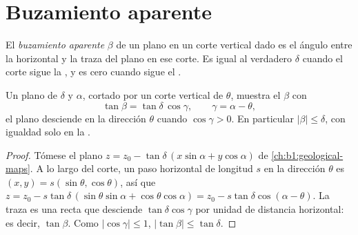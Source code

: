 \section{Buzamiento aparente}\label{sec:b1:cross-sections:apparent}

\begin{definition}\label{def:b1:cross-sections:apparent-dip}
El \emph{buzamiento aparente} $\beta$ de un plano en un corte vertical
dado es el ángulo entre la horizontal y la traza del plano en ese corte. Es igual al 
verdadero $\delta$ cuando el corte sigue la , y es cero cuando sigue el .
\end{definition}

\begin{theorem}\label{thm:b1:cross-sections:apparent-dip}
Un plano de  $\delta$ y  $\alpha$, cortado por un corte vertical
de  $\theta$, muestra el  $\beta$ con
\[
  \tan\beta = \tan\delta\,\cos\gamma, \qquad \gamma = \alpha - \theta ,
\]
el plano desciende en la dirección $\theta$ cuando $\cos\gamma > 0$. En particular $|\beta| \le \delta$, con igualdad solo en la .
\end{theorem}

\begin{proof}
Tómese el plano $z = z_0 - \tan\delta\,(x\sin\alpha + y\cos\alpha)$ de
\cref{ch:b1:geological-maps}. A lo largo del corte, un paso horizontal de longitud $s$ en la
dirección $\theta$ es $(x, y) = s(\sin\theta, \cos\theta)$, así que $z = z_0 - s\tan\delta\,(\sin\theta\sin\alpha + \cos\theta\cos\alpha) =
z_0 - s\tan\delta\cos(\alpha - \theta)$. La traza es una recta que desciende $\tan\delta\cos\gamma$
por unidad de distancia horizontal: es decir, $\tan\beta$. Como $|\cos\gamma| \le 1$,
$|\tan\beta| \le \tan\delta$.
\end{proof}


